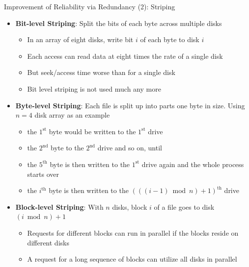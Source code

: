 \documentclass[aspectratio=169, xcolor=dvipsnames]{beamer}
\begin{document}
\begin{frame}{Improvement of Reliability via Redundancy (2): Striping}
    \begin{itemize}[<+->]
        \item \textbf{Bit-level Striping}: Split the bits of each byte across multiple disks
        \begin{itemize}
            \item[$\triangleright$] In an array of eight disks, write bit $i$ of each byte to disk $i$
            \item[$\triangleright$] Each access can read data at eight times the rate of a single disk
            \item[$\triangleright$] But seek/access time worse than for a single disk
            \item[$\triangleright$] Bit level striping is not used much any more
        \end{itemize}
        \item \textbf{Byte-level Striping}: Each file is split up into parts one byte in size. Using $n=4$ disk array as an example
        \begin{itemize}
            \item[$\triangleright$] the $1^{\text{st}}$ byte would be written to the $1^{\text{st}}$ drive
            \item[$\triangleright$] the $2^{\text{nd}}$ byte to the $2^{\text{nd}}$ drive and so on, until
            \item[$\triangleright$] the $5^{\text{th}}$ byte is then written to the $1^{\text{st}}$ drive again and the whole process starts over
            \item[$\triangleright$] the $i^{\text{th}}$ byte is then written to the $(((i-1) \bmod n) + 1)^{\text{th}}$ drive
        \end{itemize}
        \item \textbf{Block-level Striping}: With $n$ disks, block $i$ of a file goes to disk $(i \bmod n) + 1$
        \begin{itemize}
            \item[$\triangleright$] Requests for different blocks can run in parallel if the blocks reside on different disks
            \item[$\triangleright$] A request for a long sequence of blocks can utilize all disks in parallel
        \end{itemize}
    \end{itemize}
\end{frame}
\end{document}
